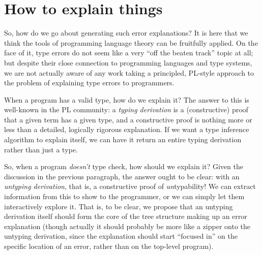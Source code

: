 \documentclass[sigplan, screen]{acmart}\settopmatter{printccs=false,printacmref=false}
\begin{document}
\section{How to explain things}

So, how do we go about generating such error explanations?  It is here
that we think the tools of programming language theory can be
fruitfully applied. On the face of it, type errors do not seem like a
very ``off the beaten track'' topic at all; but despite their close
connection to programming languages and type systems, we are not
actually aware of any work taking a principled, PL-style approach to
the problem of explaining type errors to programmers.

When a program has a valid type, how do we explain it?  The answer to
this is well-known in the PL community: a \emph{typing derivation} is
a (constructive) proof that a given term has a given type, and a
constructive proof is nothing more or less than a detailed, logically
rigorous explanation.  If we want a type inference algorithm to
explain itself, we can have it return an entire typing derivation
rather than just a type.

So, when a program \emph{doesn't} type check, how should we explain
it?  Given the discussion in the previous paragraph, the answer ought
to be clear: with an \emph{untyping derivation}, that is, a
constructive proof of \emph{un}typability!  We can extract information
from this to show to the programmer, or we can simply let them
interactively explore it.  That is, to be clear, we propose that an
untyping derivation itself should form the core of the tree structure
making up an error explanation (though actually it should probably be
more like a zipper onto the untyping derivation, since the explanation
should start ``focused in'' on the specific location of an error,
rather than on the top-level program).
\end{document}
